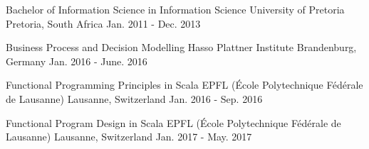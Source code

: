   \begin{cventries}
    \cventry{}{}{}{}{}
    
    \cventry
      {Bachelor of Information Science in Information Science}
      {University of Pretoria}
      {Pretoria, South Africa}
      {Jan. 2011 - Dec. 2013}
      {}

    \cventry
      {Business Process and Decision Modelling}
      {Hasso Plattner Institute}
      {Brandenburg, Germany}
      {Jan. 2016 - June. 2016}
      {}

    \cventry
      {Functional Programming Principles in Scala}
      {EPFL (École Polytechnique Fédérale de Lausanne)}
      {Lausanne, Switzerland}
      {Jan. 2016 - Sep. 2016}
      {}

    \cventry
      {Functional Program Design in Scala}
      {EPFL (École Polytechnique Fédérale de Lausanne)}
      {Lausanne, Switzerland}
      {Jan. 2017 - May. 2017}
      {}
  \end{cventries}
